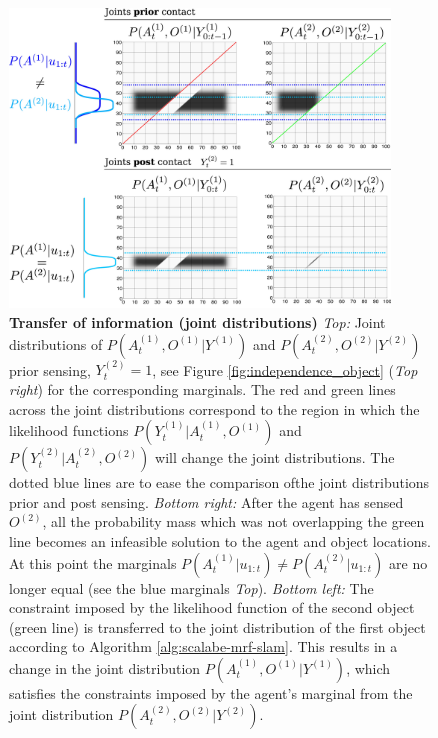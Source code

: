 \documentclass{frontiersSCNS} %
\begin{document}
\begin{figure}
  \centering
  \includegraphics[width=0.9\textwidth]{Figure9}
  \caption{\textbf{Transfer of information (joint distributions)} 
  \textit{Top:}  Joint distributions of $P(A^{(1)}_t,O^{(1)}|Y^{(1)})$ and $P(A^{(2)}_t,O^{(2)}|Y^{(2)})$ prior sensing, $Y_t^{(2)}=1$, see Figure \ref{fig:independence_object}
  (\textit{Top right}) for the corresponding marginals. The red and green lines across the joint distributions 
   correspond to the region in which the likelihood functions $P(Y^{(1)}_{t}|A^{(1)}_t,O^{(1)})$ and $P(Y^{(2)}_{t}|A^{(2)}_t,O^{(2)})$ will change the joint distributions.
  The dotted blue lines are to ease the comparison ofthe joint distributions prior and post sensing.
  \textit{Bottom right:}  After the agent has sensed $O^{(2)}$, all the probability mass which was not overlapping the green line becomes an infeasible
  solution to the agent and object locations. At this point the marginals $P(A^{(1)}_t|u_{1:t}) \not= P(A^{(2)}_t|u_{1:t})$ are no longer equal 
  (see the blue marginals \textit{Top}). \textit{Bottom left:} The constraint imposed by the likelihood function of the second object
  (green line) is transferred to the joint distribution of the first object according to Algorithm \ref{alg:scalabe-mrf-slam}.
  This results in a change in the joint distribution  $P(A^{(1)}_t,O^{(1)}|Y^{(1)})$, which satisfies the constraints 
  imposed by the agent's marginal from the joint distribution $P(A^{(2)}_t,O^{(2)}|Y^{(2)})$.}
  \label{fig:transfer_information}
\end{figure}
\end{document}
